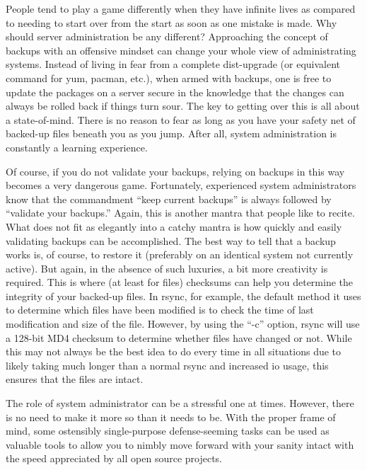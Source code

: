 People tend to play a game differently when they have infinite lives as compared
to needing to start over from the start as soon as one mistake is made. Why
should server administration be any different? Approaching the concept of
backups with an offensive mindset can change your whole view of administrating
systems. Instead of living in fear from a complete dist-upgrade (or equivalent
command for yum, pacman, etc.), when armed with backups, one is free to update
the packages on a server secure in the knowledge that the changes can always be
rolled back if things turn sour. The key to getting over this is all about a
state-of-mind. There is no reason to fear as long as you have your safety net of
backed-up files beneath you as you jump. After all, system administration is
constantly a learning experience.

Of course, if you do not validate your backups, relying on backups in this way
becomes a very dangerous game.  Fortunately, experienced system administrators
know that the commandment ``keep current backups'' is always followed by ``validate
your backups.'' Again, this is another mantra that people like to recite.  What
does not fit as elegantly into a catchy mantra is how quickly and easily
validating backups can be accomplished. The best way to tell that a backup works
is, of course, to restore it (preferably on an identical system not currently
active). But again, in the absence of such luxuries, a bit more creativity is
required. This is where (at least for files) checksums can help you determine
the integrity of your backed-up files. In rsync, for example, the default method
it uses to determine which files have been modified is to check the time of last
modification and size of the file.  However, by using the “-c” option, rsync
will use a 128-bit MD4 checksum to determine whether files have changed or not.
While this may not always be the best idea to do every time in all situations
due to likely taking much longer than a normal rsync and increased io usage,
this ensures that the files are intact.

The role of system administrator can be a stressful one at times.  However,
there is no need to make it more so than it needs to be.  With the proper frame
of mind, some ostensibly single-purpose defense-seeming tasks can be used as
valuable tools to allow you to nimbly move forward with your sanity intact with
the speed appreciated by all open source projects.
